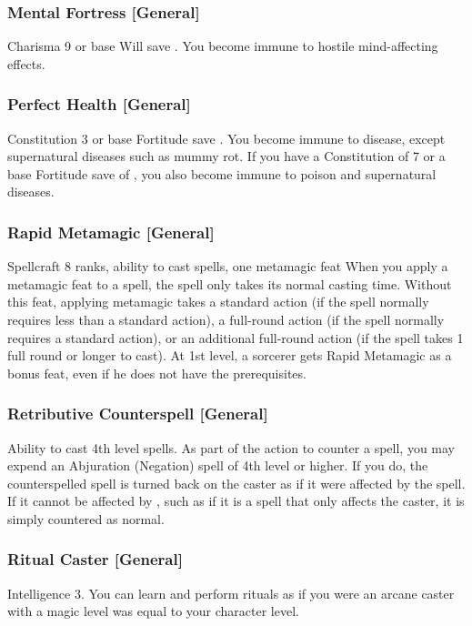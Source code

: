 \subsubsection{Mental Fortress [General]}
\featpre Charisma 9 or base Will save .
\featben You become immune to hostile mind-affecting effects.

\subsubsection{Perfect Health [General]}
\featpre Constitution 3 or base Fortitude save .
\featben You become immune to disease, except supernatural diseases such as mummy rot. If you have a Constitution of 7 or a base Fortitude save of , you also become immune to poison and supernatural diseases.

\subsubsection{Rapid Metamagic [General]}
 Spellcraft 8 ranks, ability to cast spells, one metamagic feat
 When you apply a metamagic feat to a spell, the spell only takes its normal casting time.
 Without this feat, applying metamagic takes a standard action (if the spell normally requires less than a standard action), a full-round action (if the spell normally requires a standard action), or an additional full-round action (if the spell takes 1 full round or longer to cast).
 At 1st level, a sorcerer gets Rapid Metamagic as a bonus feat, even if he does not have the prerequisites.

\subsubsection{Retributive Counterspell [General]}
 Ability to cast 4th level spells.
 As part of the action to counter a spell, you may expend an Abjuration (Negation) spell of 4th level or higher. If you do, the counterspelled spell is turned back on the caster as if it were affected by the  spell. If it cannot be affected by , such as if it is a spell that only affects the caster, it is simply countered as normal.

\subsubsection{Ritual Caster [General]}
\featpre Intelligence 3.
\featben You can learn and perform rituals as if you were an arcane caster with a magic level was equal to your character level.

